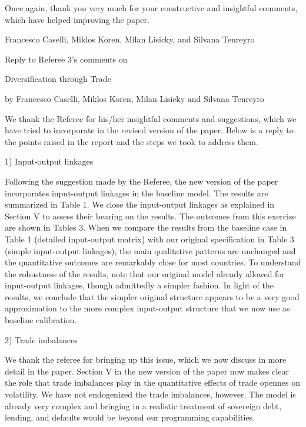 \documentclass[12pt]{article}
\begin{document}

\bigskip

Once again, thank you very much for your constructive and insightful
comments, which have helped improving the paper.\medskip \medskip \bigskip

Francesco Caselli, Miklos Koren, Milan Lisicky, and Silvana
Tenreyro\pagebreak

\begin{center}
\thispagestyle{plain}\setcounter{page}{1}

Reply to Referee 3's comments on

{\Large Diversification through Trade}

by Francesco Caselli, Miklos Koren, Milan Lisicky and Silvana
Tenreyro\medskip \medskip \bigskip
\end{center}

We thank the Referee for his/her insightful comments and suggestions, which
we have tried to incorporate in the revised version of the paper. Below is a
reply to the points raised in the report and the steps we took to address
them.

\bigskip

1) Input-output linkages

Following the suggestion made by the Referee, the new version of the paper
incorporates input-output linkages in the baseline model. The results are
summarized in Table 1. We close the input-output linkages as explained in
Section V to assess their bearing on the results. The outcomes from this
exercise are shown in Tables 3. When we compare the results from the
baseline case in Table 1 (detailed input-output matrix) with our original
specification in Table 3 (simple input-output linkages), the main
qualitative patterns are unchanged and the quantitative outcomes are
remarkably close for most countries. To understand the robustness of the
results, note that our original model already allowed for input-output
linkages, though admittedly a simpler fashion. In light of the results, we
conclude that the simpler original structure appears to be a very good
approximation to the more complex input-output structure that we now use as
baseline calibration.\bigskip 

2) Trade imbalances

We thank the referee for bringing up this issue, which we now discuss in
more detail in the paper. Section V in the new version of the paper now
makes clear the role that trade imbalances play in the quantitative effects
of trade opennes on volatility. We have not endogenized the trade
imbalances, however. The model is already very complex and bringing in a
realistic treatment of sovereign debt, lending, and defaults would be beyond
our programming capabilities. 
\end{document}
